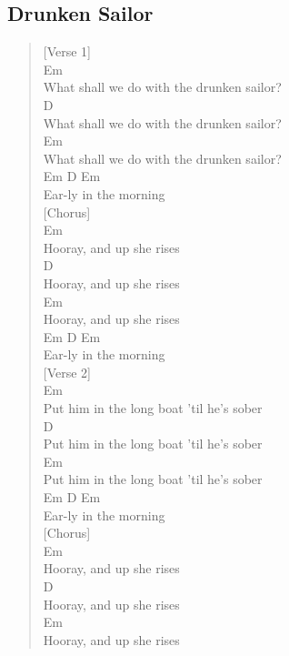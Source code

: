\documentclass[11pt]{article}
\begin{document}
\subsection{Drunken Sailor}
\label{sec:orge72bc9b}
\begin{verse}
[Verse 1]\\
Em\\
What shall we do with the drunken sailor?\\
D\\
What shall we do with the drunken sailor?\\
Em\\
What shall we do with the drunken sailor?\\
Em  D         Em\\
Ear-ly in the morning\\
\vspace*{1em}
\vspace*{1em}
[Chorus]\\
Em\\
Hooray, and up she rises\\
D\\
Hooray, and up she rises\\
Em\\
Hooray, and up she rises\\
Em  D         Em\\
Ear-ly in the morning\\
\vspace*{1em}
\vspace*{1em}
[Verse 2]\\
Em\\
Put him in the long boat 'til he's sober\\
D\\
Put him in the long boat 'til he's sober\\
Em\\
Put him in the long boat 'til he's sober\\
Em  D         Em\\
Ear-ly in the morning\\
\vspace*{1em}
\vspace*{1em}
[Chorus]\\
Em\\
Hooray, and up she rises\\
D\\
Hooray, and up she rises\\
Em\\
Hooray, and up she rises\\

\end{verse}
\end{document}
